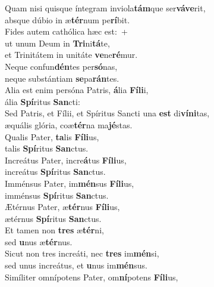\evenverse Quam nisi quisque íntegram inviola\textbf{tám}que ser\textbf{vá}\textbf{ve}rit,~\*\\
\evenverse absque dúbio in æ\textbf{tér}num pe\textbf{rí}bit.\\
\oddverse Fides autem cathólica hæc est:~+\\
\oddverse  ut unum Deum in \textbf{Tri}ni\textbf{tá}te,~\*\\
\oddverse et Trinitátem in unitáte \textbf{ve}ne\textbf{ré}mur.\\
\evenverse Neque confun\textbf{dén}tes per\textbf{só}nas,~\*\\
\evenverse neque substántiam \textbf{se}pa\textbf{rán}tes.\\
\oddverse Alia est enim persóna Patris, \textbf{á}lia \textbf{Fí}\textbf{li}i,~\*\\
\oddverse ália \textbf{Spí}ritus \textbf{San}cti:\\
\evenverse Sed Patris, et Fílii, et Spíritus Sancti una \textbf{est} di\textbf{ví}\textbf{ni}tas,~\*\\
\evenverse æquális glória, coæ\textbf{tér}na ma\textbf{jé}stas.\\
\oddverse Qualis Pater, \textbf{ta}lis \textbf{Fí}\textbf{li}us,~\*\\
\oddverse talis \textbf{Spí}ritus \textbf{San}ctus.\\
\evenverse Increátus Pater, incre\textbf{á}tus \textbf{Fí}\textbf{li}us,~\*\\
\evenverse increátus \textbf{Spí}ritus \textbf{San}ctus.\\
\oddverse Imménsus Pater, im\textbf{mén}sus \textbf{Fí}\textbf{li}us,~\*\\
\oddverse imménsus \textbf{Spí}ritus \textbf{San}ctus.\\
\evenverse Ætérnus Pater, æ\textbf{tér}nus \textbf{Fí}\textbf{li}us,~\*\\
\evenverse ætérnus \textbf{Spí}ritus \textbf{San}ctus.\\
\oddverse Et tamen non \textbf{tres} æ\textbf{tér}ni,~\*\\
\oddverse sed \textbf{u}nus æ\textbf{tér}nus.\\
\evenverse Sicut non tres increáti, nec \textbf{tres} im\textbf{mén}si,~\*\\
\evenverse sed unus increátus, et \textbf{u}nus im\textbf{mén}sus.\\
\oddverse Simíliter omnípotens Pater, om\textbf{ní}potens \textbf{Fí}\textbf{li}us,~\*\\
